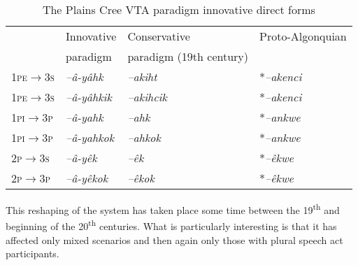 \documentclass[twoside,a4paper,11pt]{article}
\newcommand{\ipa}[1]{{\phon\textit{#1}}}
\newcommand{\grise}[1]{\cellcolor{lightgray}\textbf{#1}}
\newcommand{\Σ}{\greek{Σ}}
\begin{document}
\begin{table}[H]
\caption{The Plains Cree VTA paradigm innovative direct forms}
\centering \label{tab:cree.vta.innov.dir}
\begin{tabular}{llll}
\toprule
& Innovative & Conservative & Proto-Algonquian \\
&paradigm & paradigm (19th century) &\\
\midrule
\textsc{1pe$\rightarrow$3s} & 	\ipa{--â-yâhk} \grise{}& 	\ipa{--akiht} &  *\ipa{--akenci} \\
\textsc{1pe$\rightarrow$3s} & 	\ipa{--â-yâhkik} \grise{}& 	\ipa{--akihcik} \grise{} &  *\ipa{--akenci} \\
\textsc{1pi$\rightarrow$3p} & 	\ipa{--â-yahk} \grise{}& 	\ipa{--ahk}  & *\ipa{--ankwe} \\
\textsc{1pi$\rightarrow$3p} & 	\ipa{--â-yahkok} \grise{}& 	\ipa{--ahkok} \grise{} & *\ipa{--ankwe} \\
\midrule
\textsc{2p$\rightarrow$3s} & \ipa{--â-yêk} \grise{} & \ipa{--êk} & *\ipa{--êkwe} \\
\textsc{2p$\rightarrow$3p} & \ipa{--â-yêkok} \grise{} & \ipa{--êkok}\grise{} & *\ipa{--êkwe} \\
\bottomrule
\end{tabular}
\end{table}

This reshaping of the system has taken place some time between the 19\textsuperscript{th} and beginning of the 20\textsuperscript{th} centuries. What is particularly interesting is that it has affected only mixed scenarios and then again only those with plural speech act participants.
\end{document}
